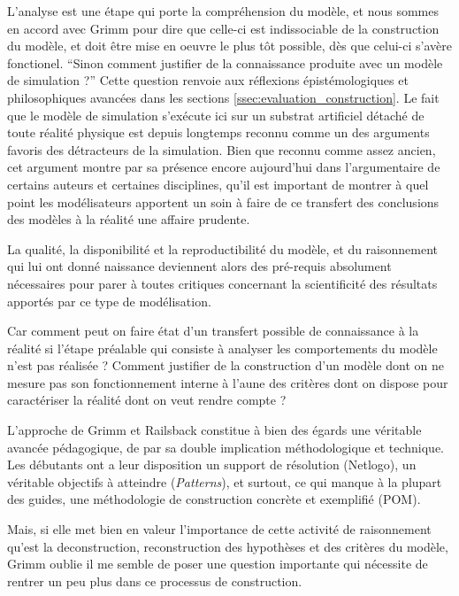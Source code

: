 L'analyse est une étape qui porte la compréhension du modèle, et nous sommes en accord avec Grimm pour dire que celle-ci est indissociable de la construction du modèle, et doit être mise en oeuvre le plus tôt possible, dès que celui-ci s'avère fonctionel. \enquote{Sinon comment justifier de la connaissance produite avec un modèle de simulation ?} Cette question renvoie aux réflexions épistémologiques et philosophiques avancées dans les sections \ref{ssec:evaluation_construction}. Le fait que le modèle de simulation s'exécute ici sur un substrat artificiel détaché de toute réalité physique est depuis longtemps reconnu comme un des arguments favoris des détracteurs de la simulation. Bien que reconnu comme assez ancien, cet argument montre par sa présence encore aujourd'hui dans l'argumentaire de certains auteurs et certaines disciplines, qu'il est important de montrer à quel point les modélisateurs apportent un soin à faire de ce transfert des conclusions des modèles à la réalité une affaire prudente. %

La qualité, la disponibilité et la reproductibilité du modèle, et du raisonnement qui lui ont donné naissance deviennent alors des pré-requis absolument nécessaires pour parer à toutes critiques concernant la scientificité des résultats apportés par ce type de modélisation. %

Car comment peut on faire état d'un transfert possible de connaissance à la réalité si l'étape préalable qui consiste à analyser les comportements du modèle n'est pas réalisée ? Comment justifier de la construction d'un modèle dont on ne mesure pas son fonctionnement interne à l'aune des critères dont on dispose pour caractériser la réalité dont on veut rendre compte ?

L'approche de Grimm et Railsback constitue à bien des égards une véritable avancée pédagogique, de par sa double implication méthodologique et technique. Les débutants ont a leur disposition un support de résolution (Netlogo), un véritable objectifs à atteindre (\textit{Patterns}), et surtout, ce qui manque à la plupart des guides, une méthodologie de construction concrète et exemplifié (POM).

Mais, si elle met bien en valeur l'importance de cette activité de raisonnement qu'est la deconstruction, reconstruction des hypothèses et des critères du modèle, Grimm oublie il me semble de poser une question importante qui nécessite de rentrer un peu plus dans ce processus de construction. %

